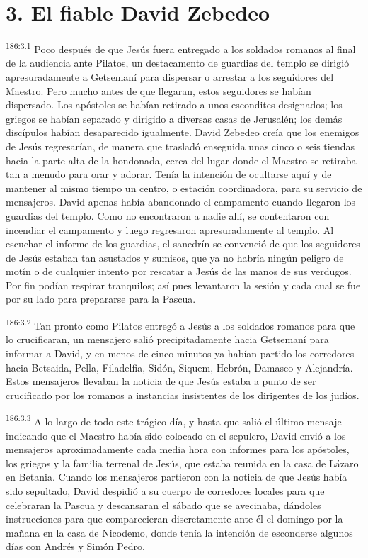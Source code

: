 \section*{3. El fiable David Zebedeo}
\par
\textsuperscript{186:3.1} Poco después de que Jesús fuera entregado a los soldados romanos al final de la audiencia ante Pilatos, un destacamento de guardias del templo se dirigió apresuradamente a Getsemaní para dispersar o arrestar a los seguidores del Maestro. Pero mucho antes de que llegaran, estos seguidores se habían dispersado. Los apóstoles se habían retirado a unos escondites designados; los griegos se habían separado y dirigido a diversas casas de Jerusalén; los demás discípulos habían desaparecido igualmente. David Zebedeo creía que los enemigos de Jesús regresarían, de manera que trasladó enseguida unas cinco o seis tiendas hacia la parte alta de la hondonada, cerca del lugar donde el Maestro se retiraba tan a menudo para orar y adorar. Tenía la intención de ocultarse aquí y de mantener al mismo tiempo un centro, o estación coordinadora, para su servicio de mensajeros. David apenas había abandonado el campamento cuando llegaron los guardias del templo. Como no encontraron a nadie allí, se contentaron con incendiar el campamento y luego regresaron apresuradamente al templo. Al escuchar el informe de los guardias, el sanedrín se convenció de que los seguidores de Jesús estaban tan asustados y sumisos, que ya no habría ningún peligro de motín o de cualquier intento por rescatar a Jesús de las manos de sus verdugos. Por fin podían respirar tranquilos; así pues levantaron la sesión y cada cual se fue por su lado para prepararse para la Pascua.

\par
\textsuperscript{186:3.2} Tan pronto como Pilatos entregó a Jesús a los soldados romanos para que lo crucificaran, un mensajero salió precipitadamente hacia Getsemaní para informar a David, y en menos de cinco minutos ya habían partido los corredores hacia Betsaida, Pella, Filadelfia, Sidón, Siquem, Hebrón, Damasco y Alejandría. Estos mensajeros llevaban la noticia de que Jesús estaba a punto de ser crucificado por los romanos a instancias insistentes de los dirigentes de los judíos.

\par
\textsuperscript{186:3.3} A lo largo de todo este trágico día, y hasta que salió el último mensaje indicando que el Maestro había sido colocado en el sepulcro, David envió a los mensajeros aproximadamente cada media hora con informes para los apóstoles, los griegos y la familia terrenal de Jesús, que estaba reunida en la casa de Lázaro en Betania. Cuando los mensajeros partieron con la noticia de que Jesús había sido sepultado, David despidió a su cuerpo de corredores locales para que celebraran la Pascua y descansaran el sábado que se avecinaba, dándoles instrucciones para que comparecieran discretamente ante él el domingo por la mañana en la casa de Nicodemo, donde tenía la intención de esconderse algunos días con Andrés y Simón Pedro.

